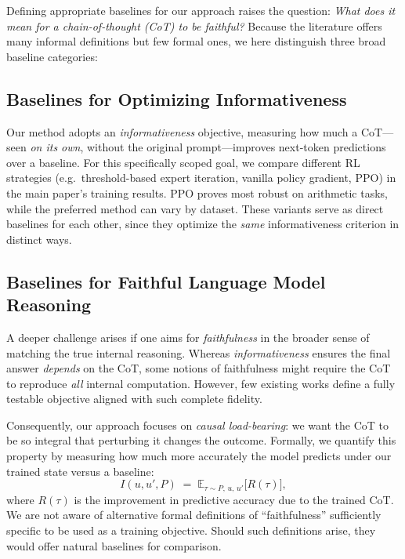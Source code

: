 \documentclass{article}
\begin{document}
Defining appropriate baselines for our approach raises the question: \emph{What does it mean for a chain-of-thought (CoT) to be faithful?} Because the literature offers many informal definitions but few formal ones, we here distinguish three broad baseline categories:

\subsection{Baselines for Optimizing Informativeness}
\label{app:baselines_informativeness}

Our method adopts an \emph{informativeness} objective, measuring how much a CoT---seen \emph{on its own}, without the original prompt---improves next-token predictions over a baseline. For this specifically scoped goal, we compare different RL strategies (e.g.\ threshold-based expert iteration, vanilla policy gradient, PPO) in the main paper's training results. PPO proves most robust on arithmetic tasks, while the preferred method can vary by dataset. These variants serve as direct baselines for each other, since they optimize the \emph{same} informativeness criterion in distinct ways.

\subsection{Baselines for Faithful Language Model Reasoning}
\label{app:baselines_faithfulness}

A deeper challenge arises if one aims for \emph{faithfulness} in the broader sense of matching the true internal reasoning. Whereas \emph{informativeness} ensures the final answer \emph{depends} on the CoT, some notions of faithfulness might require the CoT to reproduce \emph{all} internal computation. However, few existing works define a fully testable objective aligned with such complete fidelity.

Consequently, our approach focuses on \emph{causal load-bearing}: we want the CoT to be so integral that perturbing it changes the outcome. Formally, we quantify this property by measuring how much more accurately the model predicts under our trained state versus a baseline:
\begin{equation}
\label{eq:informativeness_objective}
    I(u, u', P)
    \;=\;
    \mathbb{E}_{\tau \sim P,\,u,\,u'} 
    \bigl[
        R(\tau)
    \bigr],
\end{equation}
where $R(\tau)$ is the improvement in predictive accuracy due to the trained CoT.
We are not aware of alternative formal definitions of ``faithfulness'' sufficiently specific to be used as a training objective. Should such definitions arise, they would offer natural baselines for comparison.
\end{document}
